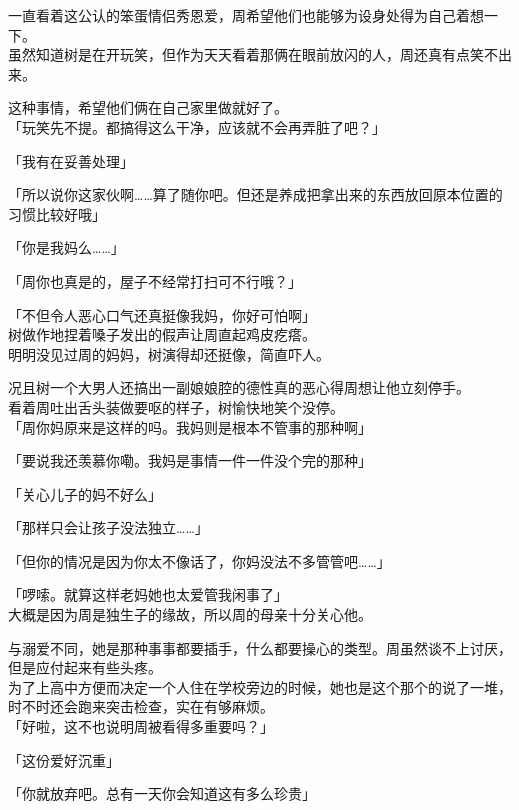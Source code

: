 一直看着这公认的笨蛋情侣秀恩爱，周希望他们也能够为设身处得为自己着想一下。\\

虽然知道树是在开玩笑，但作为天天看着那俩在眼前放闪的人，周还真有点笑不出来。

这种事情，希望他们俩在自己家里做就好了。\\

「玩笑先不提。都搞得这么干净，应该就不会再弄脏了吧？」

「我有在妥善处理」

「所以说你这家伙啊……算了随你吧。但还是养成把拿出来的东西放回原本位置的习惯比较好哦」

「你是我妈么……」

「周你也真是的，屋子不经常打扫可不行哦？」

「不但令人恶心口气还真挺像我妈，你好可怕啊」\\

树做作地捏着嗓子发出的假声让周直起鸡皮疙瘩。\\

明明没见过周的妈妈，树演得却还挺像，简直吓人。

况且树一个大男人还搞出一副娘娘腔的德性真的恶心得周想让他立刻停手。\\

看着周吐出舌头装做要呕的样子，树愉快地笑个没停。\\

「周你妈原来是这样的吗。我妈则是根本不管事的那种啊」

「要说我还羡慕你嘞。我妈是事情一件一件没个完的那种」

「关心儿子的妈不好么」

「那样只会让孩子没法独立……」

「但你的情况是因为你太不像话了，你妈没法不多管管吧……」

「啰嗦。就算这样老妈她也太爱管我闲事了」\\

大概是因为周是独生子的缘故，所以周的母亲十分关心他。

与溺爱不同，她是那种事事都要插手，什么都要操心的类型。周虽然谈不上讨厌，但是应付起来有些头疼。\\

为了上高中方便而决定一个人住在学校旁边的时候，她也是这个那个的说了一堆，时不时还会跑来突击检查，实在有够麻烦。\\

「好啦，这不也说明周被看得多重要吗？」

「这份爱好沉重」

「你就放弃吧。总有一天你会知道这有多么珍贵」

